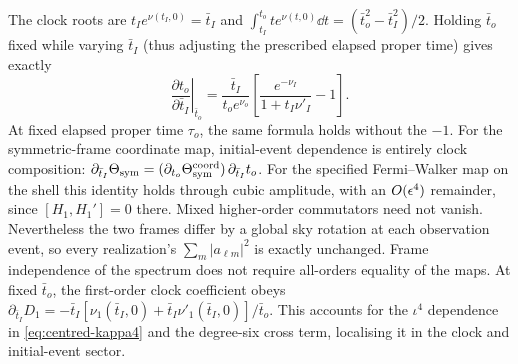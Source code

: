 \begin{remark}\label{rem:iota}
The clock roots are $t_Ie^{\nu(t_I,0)}=\bar t_I$ and
$\int_{t_I}^{t_o}te^{\nu(t,0)}\dd t=(\bar t_o^2-\bar t_I^2)/2$.
Holding $\bar t_o$ fixed while varying $\bar t_I$ (thus adjusting the prescribed elapsed
proper time) gives exactly
\[
 \left.\frac{\partial t_o}{\partial\bar t_I}\right|_{\bar t_o}
 =\frac{\bar t_I}{t_oe^{\nu_o}}
 \left[\frac{e^{-\nu_I}}{1+t_I\nu'_I}-1\right].
\]
At fixed elapsed proper time $\tau_o$, the same formula holds without the $-1$.
For the symmetric-frame coordinate map, initial-event dependence is entirely clock composition:
$\partial_{\bar t_I}\Theta_{\rm sym}
=(\partial_{t_o}\Theta^{\rm coord}_{\rm sym})\,\partial_{\bar t_I}t_o$.
For the specified Fermi--Walker map on the shell this identity holds through cubic amplitude,
with an $O(\epsilon^4)$ remainder, since $[H_1,H_1']=0$ there. Mixed higher-order commutators need
not vanish. Nevertheless the two frames differ by a global sky rotation at each observation
event, so every realization's $\sum_m|a_{\ell m}|^2$ is exactly unchanged. Frame independence
of the spectrum does not require all-orders equality of the maps.
At fixed $\bar t_o$, the first-order clock coefficient obeys
$\partial_{\bar t_I}D_1=-\bar t_I[\nu_1(\bar t_I,0)+\bar t_I\nu'_1(\bar t_I,0)]/\bar t_o$.
This accounts for the $\iota^4$ dependence in \eqref{eq:centred-kappa4} and the degree-six
cross term, localising it in the clock and initial-event sector.
\end{remark}
